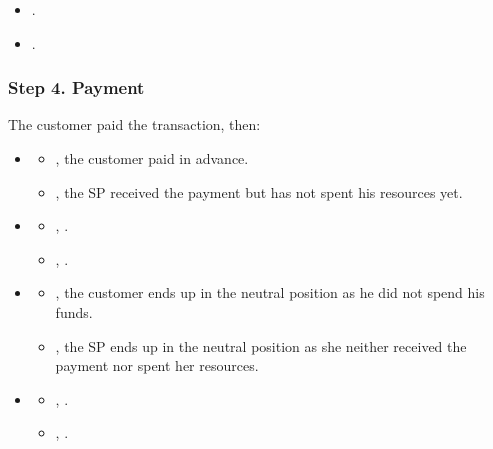 \Fairness

\begin{itemize}
  \item {}.
  \item {}.
\end{itemize}



\subsubsection*{Step 4. \CustomerTurn{} Payment}

The customer paid the transaction, then:

\begin{itemize}
\item \AgreeablePath
  \begin{itemize}
    \item {}, the customer paid in advance.
    \item {}, the SP received the payment but has not spent his resources yet.
  \end{itemize}
\item \DisputePath
  \begin{itemize}
    \item {}, \CustomerLosesBeforePoP{}.
    \item {}, .
  \end{itemize}
\end{itemize}

\ActedAbnormallyThen{\customer}

\begin{itemize}
\item \AgreeablePath
  \begin{itemize}
    \item {}, the customer ends up in the neutral position as he did not spend his funds.
    \item {}, the SP ends up in the neutral position as she neither received the payment nor spent her resources.
  \end{itemize}
\item \DisputePath
  \begin{itemize}
    \item {}, \CustomerLosesBeforePayment{}.
    \item {}, .
  \end{itemize}
\end{itemize}

